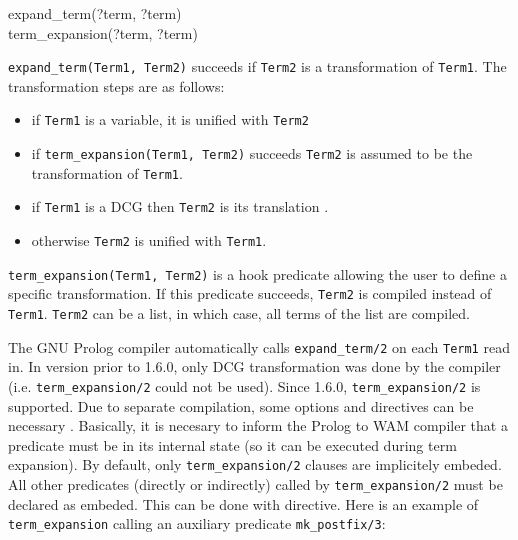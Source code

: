 \begin{TemplatesOneCol}
expand\_term(?term, ?term)\\
term\_expansion(?term, ?term)

\end{TemplatesOneCol}

\Description

\texttt{expand\_term(Term1, Term2)} succeeds if
\texttt{Term2} is a transformation of \texttt{Term1}. The transformation
steps are as follows:

\begin{itemize}

\item if \texttt{Term1} is a variable, it is unified with \texttt{Term2}

\item if \texttt{term\_expansion(Term1, Term2)} succeeds \texttt{Term2} is
  assumed to be the transformation of \texttt{Term1}.

\item if \texttt{Term1} is a DCG then \texttt{Term2} is its translation
  .

\item otherwise \texttt{Term2} is unified with \texttt{Term1}.

\end{itemize}

\texttt{term\_expansion(Term1, Term2)} is a hook predicate allowing the user to
define a specific transformation. If this predicate succeeds, \texttt{Term2} is
compiled instead of \texttt{Term1}. \texttt{Term2} can be a list, in which case,
all terms of the list are compiled.

The GNU Prolog compiler  automatically calls
\texttt{expand\_term/2} on each \texttt{Term1} read in. In version prior to
1.6.0, only DCG transformation was done by the compiler
(i.e. \texttt{term\_expansion/2} could not be used). Since 1.6.0,
\texttt{term\_expansion/2} is supported. Due to separate compilation, some
 options and directives can be necessary
. Basically, it is necesary to inform the Prolog to
WAM compiler that a predicate must be  in its internal state (so it
can be executed during term expansion). By default, only
\texttt{term\_expansion/2} clauses are implicitely embeded. All other predicates
(directly or indirectly) called by \texttt{term\_expansion/2} must be declared
as embeded. This can be done with  directive. Here is
an example of \texttt{term\_expansion} calling an auxiliary predicate
\texttt{mk\_postfix/3}:

